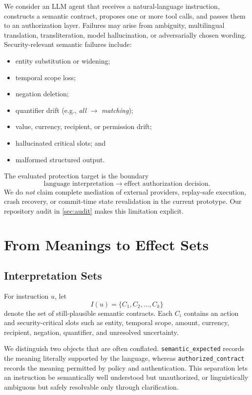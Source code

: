 We consider an LLM agent that receives a natural-language instruction, constructs a semantic contract, proposes one or more tool calls, and passes them to an authorization layer. Failures may arise from ambiguity, multilingual translation, transliteration, model hallucination, or adversarially chosen wording. Security-relevant semantic failures include:
\begin{itemize}
  \item entity substitution or widening;
  \item temporal scope loss;
  \item negation deletion;
  \item quantifier drift (e.g., \emph{all} $\rightarrow$ \emph{matching});
  \item value, currency, recipient, or permission drift;
  \item hallucinated critical slots; and
  \item malformed structured output.
\end{itemize}

The evaluated protection target is the boundary
\[
\text{language interpretation}\rightarrow\text{effect authorization decision}.
\]
We do \emph{not} claim complete mediation of external providers, replay-safe execution, crash recovery, or commit-time state revalidation in the current prototype. Our repository audit in \cref{sec:audit} makes this limitation explicit.

\section{From Meanings to Effect Sets}

\subsection{Interpretation Sets}
For instruction $u$, let
\begin{equation}
I(u)=\{C_1,C_2,\dots,C_k\}
\end{equation}
denote the set of still-plausible semantic contracts. Each $C_i$ contains an action and security-critical slots such as entity, temporal scope, amount, currency, recipient, negation, quantifier, and unresolved uncertainty.

We distinguish two objects that are often conflated. \texttt{semantic\_expected} records the meaning literally supported by the language, whereas \texttt{authorized\_contract} records the meaning permitted by policy and authentication. This separation lets an instruction be semantically well understood but unauthorized, or linguistically ambiguous but safely resolvable only through clarification.

